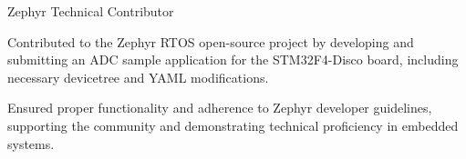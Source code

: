 

\begin{cventries}

  \cventry
    {} %
    {Zephyr Technical Contributor} %
    {} %
    {} %
    {
      \begin{cvitems} %
        \item {Contributed to the Zephyr RTOS open-source project by developing and submitting an ADC sample application for the STM32F4-Disco board, including necessary devicetree and YAML modifications.}
        \item {Ensured proper functionality and adherence to Zephyr developer guidelines, supporting the community and demonstrating technical proficiency in embedded systems.}
      \end{cvitems}
    }


\end{cventries}
